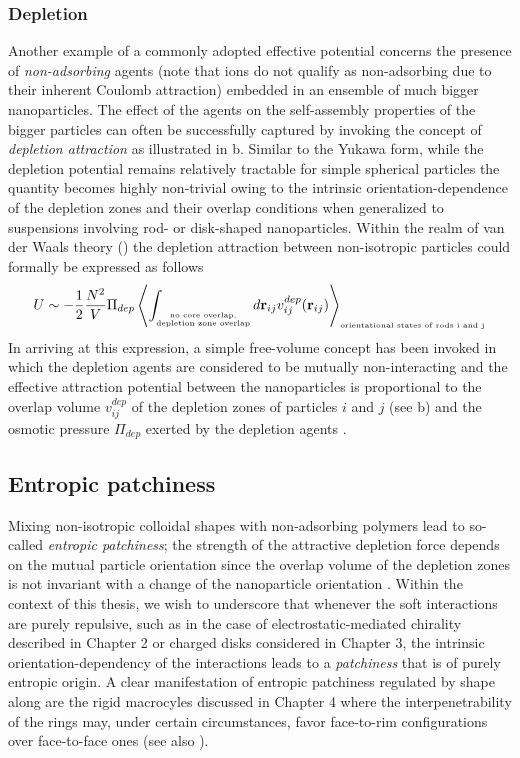 \documentclass[amssymb]{revtex4}
\begin{document}
\subsubsection{{\bf Depletion}}
Another example of a commonly adopted effective potential concerns the presence of {\em non-adsorbing} agents (note that ions do not qualify as non-adsorbing due to their inherent Coulomb attraction) embedded in an ensemble of much bigger nanoparticles. The effect of the agents on the self-assembly properties of the bigger particles can often be successfully captured by invoking the concept of {\em depletion attraction} \cite{lekkerkerker2011colloids} as illustrated in b. 
Similar to the Yukawa form, while the depletion potential remains relatively tractable for simple spherical particles the quantity  becomes highly non-trivial owing to the intrinsic  orientation-dependence of the depletion zones and their overlap conditions when generalized to suspensions involving rod- or disk-shaped nanoparticles. 
 Within the realm of van der Waals theory () the depletion attraction between non-isotropic particles could formally be expressed as follows
 \begin{equation}
U \sim  -\frac{1}{2} \frac{N^{2}}{V} \Pi_{dep} \left \langle \int_{
\substack{
\mbox{\tiny no core overlap,} \\ 
\mbox{\tiny depletion zone overlap}
}
} d {\bf r}_{ij}   v^{dep}_{ij}({\bf r}_{ij})  \right \rangle_{\mbox{\tiny orientational states of rods i and j}} 
\label{degen}
\end{equation}
In arriving at this expression,  a simple free-volume concept has been invoked in which the depletion agents are considered to be mutually non-interacting and the effective attraction potential between the nanoparticles is proportional to the overlap volume $v^{dep}_{ij}$ of the depletion zones of particles $i$ and $j$ (see b) and the osmotic pressure $\Pi_{dep}$ exerted by the depletion agents \cite{lekkerkerker2011colloids}.   

\subsection{Entropic patchiness}

Mixing non-isotropic colloidal shapes with non-adsorbing polymers lead to so-called {\em entropic patchiness}; the strength of the attractive depletion force depends on the mutual particle orientation since the overlap volume of the depletion zones is not invariant  with a change of the nanoparticle orientation \cite{petu2017}.
Within the context of this thesis, we wish to underscore that whenever the soft interactions are purely  repulsive, such as in the case of electrostatic-mediated chirality described in Chapter 2  or charged disks considered in Chapter 3, the intrinsic  orientation-dependency of the interactions leads to a {\em patchiness} that is of purely entropic origin. A clear manifestation of entropic patchiness regulated by shape along are the rigid macrocyles discussed in Chapter 4 where  the interpenetrability of the rings may, under certain circumstances, favor face-to-rim configurations over face-to-face ones (see also ).
\end{document}
